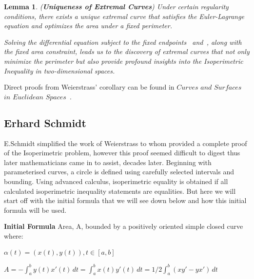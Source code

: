 \documentclass[a4paper]{book}
\newtheorem{lemma}[theorem]{Lemma}%
\begin{document}
    \begin{lemma}(\textbf{Uniqueness of Extremal Curves})
        Under certain regularity conditions, there exists a unique extremal curve that satisfies the Euler-Lagrange equation and optimizes the area under a fixed perimeter.

        Solving the differential equation subject to the fixed endpoints~\cite{goldstein1980classical} and~\cite{hilbert1985methods}, along with the fixed area constraint, leads us to the discovery of extremal curves that not only minimize the perimeter but also provide profound insights into the Isoperimetric Inequality in two-dimensional spaces.
    \end{lemma}
Direct proofs from Weierstrass' corollary can be found in $Curves$ $and$ $Surfaces$ $in$ $Euclidean$ $Spaces$~\cite{chern1966curves}.

\subsection{Erhard Schmidt}
E.Schmidt simplified the work of Weierstrass to whom provided a complete proof of the Isoperimetric problem, however this proof seemed difficult to digest thus later mathematicians came in to assist, decades later. Beginning with parameterised curves, a circle is defined using carefully selected intervals and bounding. Using advanced calculus, isoperimetric equality is obtained if all calculated isoperimetric inequality statements are equalities. But here we will start off with the initial formula that we will see down below and how this initial formula will be used.

\textbf{Initial Formula}
Area, A, bounded by a positively oriented simple closed curve where: 
\begin{center}
	$\alpha(t)=(x(t),y(t)), t\in [a,b]$
\end{center}
\begin{center}
	$A=-\int_{a}^{b}y(t)x'(t)\,dt=\int_{a}^{b}x(t)y'(t)\,dt = 1/2\int_{a}^{b}(xy'-yx')\,dt$
\end{center}
\end{document}
